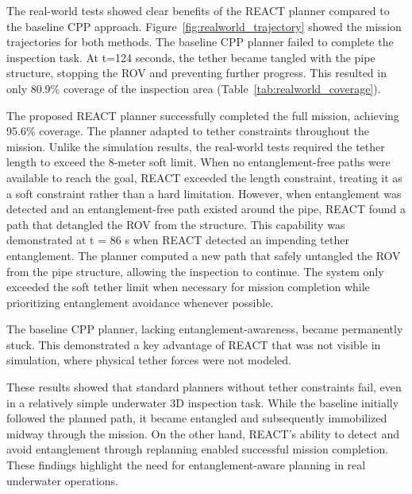 The real-world tests showed clear benefits of the \ac{REACT} planner compared to the baseline \ac{CPP} approach. Figure~\ref{fig:realworld_trajectory} showed the mission trajectories for both methods.
The baseline \ac{CPP} planner failed to complete the inspection task. At t=124 seconds, the tether became tangled with the pipe structure, stopping the \ac{ROV} and preventing further progress. This resulted in only 80.9\% coverage of the inspection area (Table~\ref{tab:realworld_coverage}).

The proposed \ac{REACT} planner successfully completed the full mission, achieving 95.6\% coverage. The planner adapted to tether constraints throughout the mission. Unlike the simulation results, the real-world tests required the tether length to exceed the 8-meter soft limit. When no entanglement-free paths were available to reach the goal, \ac{REACT} exceeded the length constraint, treating it as a soft constraint rather than a hard limitation. However, when entanglement was detected and an entanglement-free path existed around the pipe, \ac{REACT} found a path that detangled the \ac{ROV} from the structure. This capability was demonstrated at t = 86 s when \ac{REACT} detected an impending tether entanglement. The planner computed a new path that safely untangled the \ac{ROV} from the pipe structure, allowing the inspection to continue. The system only exceeded the soft tether limit when necessary for mission completion while prioritizing entanglement avoidance whenever possible.

The baseline \ac{CPP} planner, lacking entanglement-awareness, became permanently stuck. This demonstrated a key advantage of \ac{REACT} that was not visible in simulation, where physical tether forces were not modeled.

These results showed that standard planners without tether constraints fail, even in a relatively simple underwater 3D inspection task. While the baseline initially followed the planned path, it became entangled and subsequently immobilized midway through the mission. On the other hand, \ac{REACT}'s ability to detect and avoid entanglement through replanning enabled successful mission completion. These findings highlight the need for entanglement-aware planning in real underwater operations.

\begin{table}[t]
    \centering
    \caption{Coverage Performance in Real-world Trials}
    \label{tab:realworld_coverage}
    \vspace{0.5em}
\end{table}

